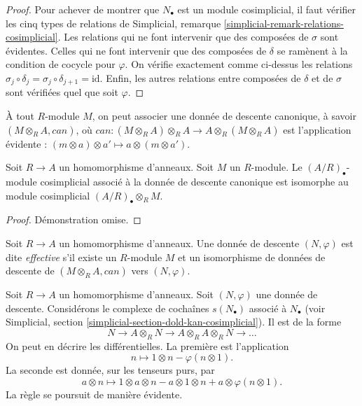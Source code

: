 \begin{proof}
\medskip\noindent
Pour achever de montrer que $N_\bullet$ est un module cosimplicial,
il faut vérifier les cinq types de relations de
Simplicial, remarque \ref{simplicial-remark-relations-cosimplicial}.
Les relations qui ne font intervenir que des composées de $\sigma$ sont
évidentes. Celles qui ne font intervenir que des composées de $\delta$ se
ramènent à la condition de cocycle pour $\varphi$.
On vérifie exactement comme ci-dessus les relations
$\sigma_j \circ \delta_j = \sigma_j \circ \delta_{j + 1} = \text{id}$.
Enfin, les autres relations entre composées de $\delta$ et de $\sigma$
sont vérifiées quel que soit $\varphi$.
\end{proof}

\noindent
À tout $R$-module $M$, on peut associer une donnée de descente canonique,
à savoir $(M \otimes_R A, can)$, où
$can : (M \otimes_R A) \otimes_R A \to A \otimes_R (M \otimes_R A)$
est l'application évidente :
$(m \otimes a) \otimes a' \mapsto a \otimes (m \otimes a')$.

\begin{lemma}
\label{lemma-canonical-descent-datum-cosimplicial}
Soit $R \to A$ un homomorphisme d'anneaux.
Soit $M$ un $R$-module. Le
$(A/R)_\bullet$-module cosimplicial associé à la donnée de descente canonique
est isomorphe au module cosimplicial $(A/R)_\bullet \otimes_R M$.
\end{lemma}

\begin{proof}
Démonstration omise.
\end{proof}

\begin{definition}
\label{definition-descent-datum-effective-module}
Soit $R \to A$ un homomorphisme d'anneaux.
Une donnée de descente $(N, \varphi)$ est dite {\it effective}
s'il existe un $R$-module $M$ et un isomorphisme de données de descente
de $(M \otimes_R A, can)$ vers
$(N, \varphi)$.
\end{definition}

\noindent
Soit $R \to A$ un homomorphisme d'anneaux.
Soit $(N, \varphi)$ une donnée de descente.
Considérons le complexe de cochaînes $s(N_\bullet)$ associé
à $N_\bullet$ (voir
Simplicial, section \ref{simplicial-section-dold-kan-cosimplicial}).
Il est de la forme
$$
N \to A \otimes_R N \to A \otimes_R A \otimes_R N \to \ldots
$$
On peut en décrire les différentielles.
La première est l'application
$$
n \longmapsto 1 \otimes n - \varphi(n \otimes 1).
$$
La seconde est donnée, sur les tenseurs purs, par
$$
a \otimes n \longmapsto 1 \otimes a \otimes n
- a \otimes 1 \otimes n + a \otimes \varphi(n \otimes 1).
$$
La règle se poursuit de manière évidente.

